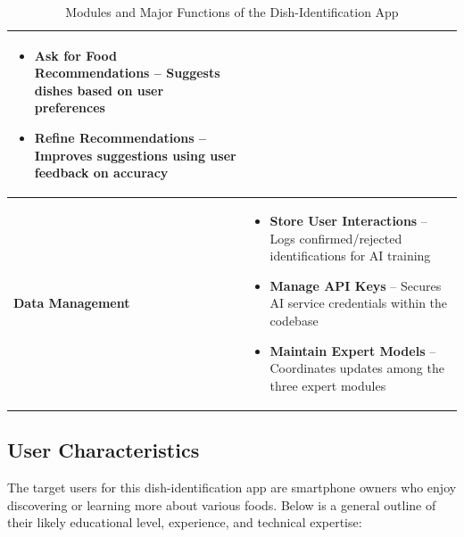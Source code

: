 \documentclass[]{article}
\begin{document}
\begin{table}[H]
\begin{tabular}{|p{4cm}|p{10cm}|}
\begin{itemize}
    \item \textbf{Ask for Food Recommendations} – Suggests dishes based on user preferences
    \item \textbf{Refine Recommendations} – Improves suggestions using user feedback on accuracy
\end{itemize} \\
\hline
\textbf{Data Management} &
\begin{itemize}
    \item \textbf{Store User Interactions} – Logs confirmed/rejected identifications for AI training
    \item \textbf{Manage API Keys} – Secures AI service credentials within the codebase
    \item \textbf{Maintain Expert Models} – Coordinates updates among the three expert modules
\end{itemize} \\
\hline
\end{tabular}
\caption{Modules and Major Functions of the Dish-Identification App}
\label{tab:dish-functions}
\end{table}

\subsection{User Characteristics}
\label{sub:user_characteristics}

The target users for this dish-identification app are smartphone owners who enjoy discovering or learning more about various foods. Below is a general outline of their likely educational level, experience, and technical expertise:
\end{document}
